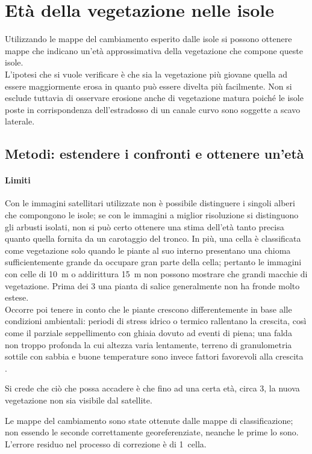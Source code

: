 \section{Età della vegetazione nelle isole}
Utilizzando le mappe del cambiamento esperito dalle isole si possono ottenere mappe che indicano un'età approssimativa della vegetazione che compone queste isole. 
\\
L'ipotesi che si vuole verificare è che sia la vegetazione più giovane quella ad essere maggiormente erosa in quanto può essere divelta più facilmente.
Non si esclude tuttavia di osservare erosione anche di vegetazione matura poiché le isole poste in corrispondenza dell'estradosso di un canale curvo sono soggette a scavo laterale.

\subsection{Metodi: estendere i confronti e ottenere un'età}
\paragraph{Limiti}
Con le immagini satellitari utilizzate non è possibile distinguere i singoli alberi che compongono le isole; se con le immagini a miglior risoluzione si distinguono gli arbusti isolati, non si può certo ottenere una stima dell'età tanto precisa quanto quella fornita da un carotaggio del tronco.
In più, una cella è classificata come vegetazione solo quando le piante al suo interno presentano una chioma sufficientemente grande da occupare gran parte della cella; pertanto le immagini con celle di \SI{10}{\m} o addirittura \SI{15}{\m} non possono mostrare che grandi macchie di vegetazione.
Prima dei \SI{3}{\anni} una pianta di salice generalmente non ha fronde molto estese.
\\
Occorre poi tenere in conto che le piante crescono differentemente in base alle condizioni ambientali: periodi di stress idrico o termico rallentano la crescita, così come il parziale seppellimento con ghiaia dovuto ad eventi di piena; una falda non troppo profonda la cui altezza varia lentamente, terreno di granulometria sottile con sabbia e buone temperature sono invece fattori favorevoli alla crescita .

Si crede che ciò che possa accadere è che fino ad una certa età, circa \SI{3}{\anni}, la nuova vegetazione non sia visibile dal satellite. 

Le mappe del cambiamento sono state ottenute dalle mappe di classificazione; non essendo le seconde correttamente georeferenziate, neanche le prime lo sono. L'errore residuo nel processo di correzione è di 1~cella.

